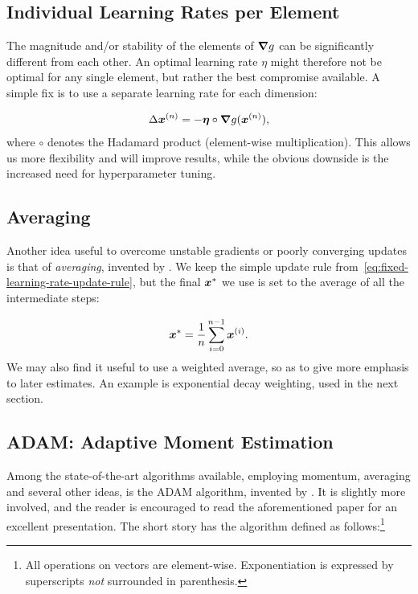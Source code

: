 \documentclass[Thesis.tex]{subfiles}
\begin{document}
\subsection{Individual Learning Rates per Element}

The magnitude and/or stability of the elements of $\grad{g}$ can be
significantly different from each other. An optimal learning rate $\eta$ might
therefore not be optimal for any single element, but rather the best compromise
available. A simple fix is to use a separate learning rate for each dimension:

\begin{align}
  \Delta\bm{x}^{(n)} = -\bm{\eta}\circ\grad{g}(\bm{x}^{(n)}),
\end{align}
where $\circ$ denotes the Hadamard product (element-wise multiplication). This
allows us more flexibility and will improve results, while the obvious downside
is the increased need for hyperparameter tuning.


\subsection{Averaging}

Another idea useful to overcome unstable gradients or poorly converging updates
is that of \emph{averaging}, invented by \textcite{Polyak-1992}. We keep the
simple update rule from~\cref{eq:fixed-learning-rate-update-rule}, but the final
$\bm{x}^*$ we use is set to the average of all the intermediate steps:

\begin{align}
  \label{eq:averaging-update-rule-def}
  \bm{x}^* = \frac{1}{n}\sum_{i=0}^{n-1} \bm{x}^{(i)}.
\end{align}
We may also find it useful to use a weighted average, so as to give more emphasis
to later estimates. An example is exponential decay weighting, used in the next section.


\subsection{ADAM: Adaptive Moment Estimation}
\label{sec:adam}

Among the state-of-the-art algorithms available, employing momentum,
averaging and several other ideas, is the ADAM algorithm, invented by
\textcite{KingmaB14}. It is slightly more involved, and the reader is encouraged
to read the aforementioned paper for an excellent presentation. The short story
has the algorithm defined as follows:\footnote{All operations on vectors are
  element-wise. Exponentiation is expressed by superscripts \emph{not}
  surrounded in parenthesis.}
\end{document}
